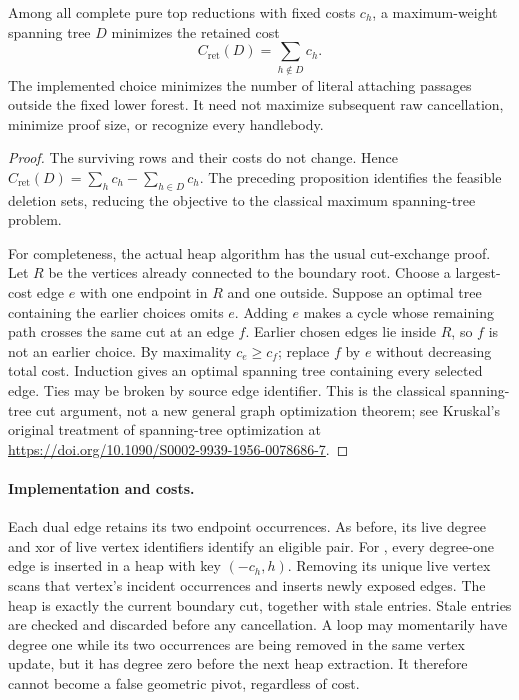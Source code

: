 \begin{proposition}
Among all complete pure top reductions with fixed costs $c_h$, a
maximum-weight spanning tree $D$ minimizes the retained cost
\[
 C_{\mathrm{ret}}(D)=\sum_{h\notin D}c_h.
\]
The implemented choice minimizes the number of literal attaching passages
outside the fixed lower forest. It need not maximize subsequent raw
cancellation, minimize proof size, or recognize every handlebody.
\end{proposition}
\begin{proof}
The surviving rows and their costs do not change. Hence
$C_{\mathrm{ret}}(D)=\sum_hc_h-\sum_{h\in D}c_h$. The preceding proposition
identifies the feasible deletion sets, reducing the objective to the
classical maximum spanning-tree problem.

For completeness, the actual heap algorithm has the usual cut-exchange
proof. Let $R$ be the vertices already connected to the boundary root.
Choose a largest-cost edge $e$ with one endpoint in $R$ and one outside.
Suppose an optimal tree containing the earlier choices omits $e$. Adding
$e$ makes a cycle whose remaining path crosses the same cut at an edge
$f$. Earlier chosen edges lie inside $R$, so $f$ is not an earlier choice.
By maximality $c_e\ge c_f$; replace $f$ by $e$ without decreasing total
cost. Induction gives an optimal spanning tree containing every selected
edge. Ties may be broken by source edge identifier. This is the classical
spanning-tree cut argument, not a new general graph optimization theorem;
see Kruskal's original treatment of spanning-tree optimization at
\url{https://doi.org/10.1090/S0002-9939-1956-0078686-7}.
\end{proof}

\paragraph{Implementation and costs.}
Each dual edge retains its two endpoint occurrences. As before, its live
degree and xor of live vertex identifiers identify an eligible pair.
For , every degree-one edge is inserted in a
heap with key $(-c_h,h)$. Removing its unique live vertex scans that vertex's
incident occurrences and inserts newly exposed edges. The heap is exactly
the current boundary cut, together with stale entries. Stale entries are
checked and discarded before any cancellation. A loop may momentarily
have degree one while its two occurrences are being removed in the same
vertex update, but it has degree zero before the next heap extraction.
It therefore cannot become a false geometric pivot, regardless of cost.

